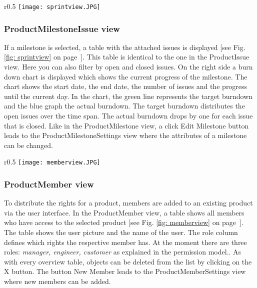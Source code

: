 \begin{wrapfigure}{r}{0.5\textwidth}
    \centering
    \texttt{[image: sprintview.JPG]}
    \caption{ProductMilestoneIssue view}
    \label{fig: sprintview}
\end{wrapfigure}

\subsubsection*{ProductMilestoneIssue view}

If a milestone is selected, a table with the attached issues is displayed [see Fig. \ref{fig: sprintview} on page~\pageref{fig: sprintview}]. This table is identical to the one in the ProductIssue view. Here you can also filter by open and closed issues. On the right side a burn down chart is displayed which shows the current progress of the milestone. The chart shows the start date, the end date, the number of issues and the progress until the current day. In the chart, the green line represents the target burndown and the blue graph the actual burndown. The target burndown distributes the open issues over the time span. The actual burndown drops by one for each issue that is closed.  Like in the ProductMilestone view, a click Edit Milestone button leads to the ProductMilestoneSettings view where the attributes of a milestone can be changed.

\begin{wrapfigure}{r}{0.5\textwidth}
    \centering
    \texttt{[image: memberview.JPG]}
    \caption{Member view}
    \label{fig: memberview}
\end{wrapfigure}

\subsubsection*{ProductMember view}

To distribute the rights for a product, members are added to an existing product via the user interface. In the ProductMember view, a table shows all members who have access to the selected product [see Fig. \ref{fig: memberview} on page~\pageref{fig: memberview}]. The table shows the user picture and the name of the user. The role column defines which rights the respective member has. At the moment there are three roles: \textit{manager, engineer, customer} as explained in the permission model.. As with every overview table, objects can be deleted from the list by clicking on the X button. The button New Member leads to the ProductMemberSettings view where new members can be added.